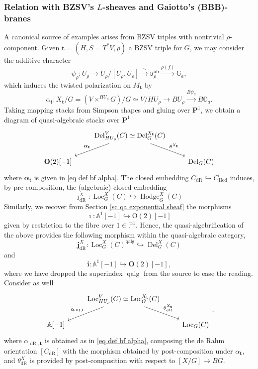 \documentclass[11pt, a4paper]{amsart}
\numberwithin{equation}{section}
\theoremstyle{definition}
\theoremstyle{remark}
\DeclareMathOperator{\Loc}{Loc}
\DeclareMathOperator{\Hodge}{Hodge}
\DeclareMathOperator{\dR}{dR}
\DeclareMathOperator{\Hod}{Hod}
\DeclareMathOperator{\Del}{Del}
\DeclareMathOperator{\qalg}{\mathrm{qalg}}
\renewcommand{\O}{\mathrm{O}}
\newcommand{\OO}{\mathbf{O}}
\renewcommand{\P}{\mathbf{P}}
\renewcommand{\AA}{\mathbb{A}}
\newcommand{\GG}{\mathbb{G}}
\newcommand{\PP}{\mathbb{P}}
\renewcommand{\to}{\longrightarrow}
\begin{document}
\subsubsection{Relation with BZSV's $L$-sheaves and Gaiotto's (BBB)-branes}
A canonical source of examples arises from BZSV triples with nontrivial $\rho$-component. Given $\mathbf{t} = (H,S = T^*V,\rho)$ a BZSV triple for $G$, we may consider the additive character
$$\psi_\rho: U_\rho \to U_\rho/[U_\rho,U_\rho] \overset{\simeq}{\to} \mathfrak{u}_\rho^{\mathrm{ab}} \overset{\rho(f)}{\to} \GG_a,$$
which induces the twisted polarization on $M_\mathbf{t}$ by
\begin{equation}
    \alpha_\mathbf{t}: X_\mathbf{t}/G = (V \times^{HU_\rho} G)/G \simeq V/HU_\rho\to BU_\rho \overset{B\psi_\rho}{\to} B\GG_a.
\end{equation}
Taking mapping stacks from Simpson shapes and gluing over $\P^1$, we obtain a diagram of quasi-algebraic stacks over $\P^1$
\begin{equation} \label{eq diagram for constructing B for t}
\begin{tikzcd}
	& {\Del_{HU_\rho}^V(C) \simeq \Del_G^{X_\mathbf{t}}}(C) & \\
	{\mathbf{O}(2)[-1]} && {\Del_G(C)}
	\arrow["{\boldsymbol{\alpha}_\mathbf{t}}"', from=1-2, to=2-1]
	\arrow["{\theta^{X_{\mathbf{t}}}}", from=1-2, to=2-3]
\end{tikzcd}
\end{equation}
where $\boldsymbol{\alpha}_\mathbf{t}$ is given in \eqref{eq def bf alpha}. The closed embedding $C_{\dR} \hookrightarrow C_{\Hod}$ induces, by pre-composition, the (algebraic) closed embedding 
\[
\jmath^X_{\dR} : \Loc_G^X(C) \hookrightarrow \Hodge_G^X(C)
\] 
Similarly, we recover from Section \ref{sc qa exponential sheaf} the morphisms
\[
\imath : \AA^1[-1] \hookrightarrow \O(2)[-1]
\]
given by restriction to the fibre over $1 \in \PP^1$. Hence, the quasi-algebrification of the above provides the following morphism within the quasi-algebraic category,  
\[
\mathbf{j}^X_{\dR} : \Loc_G^X(C)^{\qalg} \hookrightarrow \Del_G^X(C)
\]
and
\[
\mathbf{i} : \AA^1[-1] \hookrightarrow \OO(2)[-1],
\]
where we have dropped the superindex $\qalg$ from the source to ease the reading. Consider as well
\begin{equation}\label{eq diagram for constructing B_dR for t}
\begin{tikzcd}
	& {\Loc_{HU_\rho}^V(C) \simeq \Loc_G^{X_\mathbf{t}}}(C) & \\
	{\AA[-1]} && {\Loc_G(C)}
	\arrow["{\alpha_{\dR,\mathbf{t}}}"', from=1-2, to=2-1]
	\arrow["{\theta_{\dR}^{X_{\mathbf{t}}}}", from=1-2, to=2-3]
\end{tikzcd},
\end{equation}
where $\alpha_{\dR,\mathbf{t}}$ is obtained as in \eqref{eq def bf alpha}, composing the de Rahm orientation $[C_{\dR}]$ with the morphism obtained by post-composition under $\alpha_{\mathbf{t}}$, and $\theta^X_{\dR}$ is provided by post-composition with respect to $[X/G] \to BG$. 
\end{document}
